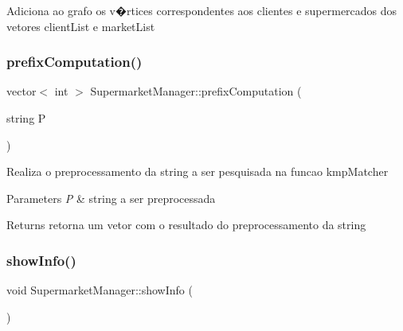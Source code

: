 Adiciona ao grafo os v�rtices correspondentes aos clientes e supermercados dos vetores client\+List e market\+List \mbox{\label{class_supermarket_manager_a3f18b0466fcb9369084ecd0c4e2d2e4a}} 
\subsubsection{\texorpdfstring{prefix\+Computation()}{prefixComputation()}}
{\footnotesize\ttfamily vector$<$ int $>$ Supermarket\+Manager\+::prefix\+Computation (\begin{DoxyParamCaption}\item[{string}]{P }\end{DoxyParamCaption})}

Realiza o preprocessamento da string a ser pesquisada na funcao kmp\+Matcher 
\begin{DoxyParams}{Parameters}
{\em P} & string a ser preprocessada \\
\hline
\end{DoxyParams}
\begin{DoxyReturn}{Returns}
retorna um vetor com o resultado do preprocessamento da string 
\end{DoxyReturn}
\mbox{\label{class_supermarket_manager_a3bbfc2db4c66bbaab3a5536c7205a818}} 
\subsubsection{\texorpdfstring{show\+Info()}{showInfo()}}
{\footnotesize\ttfamily void Supermarket\+Manager\+::show\+Info (\begin{DoxyParamCaption}{ }\end{DoxyParamCaption})}

